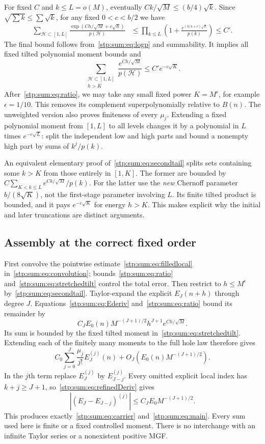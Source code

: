 \documentclass[11pt]{article}
\theoremstyle{remark}\newtheorem{remark}[theorem]{Remark}
\newcommand{\cH}{\mathcal H}
\begin{document}
For fixed $C$ and $k\le L=o(M)$, eventually $Ck/\sqrt M\le(b/4)\sqrt k$. Since $\sqrt{\sum k}\le\sum\sqrt k$, for any fixed $0<c<b/2$ we have
\begin{align}
 \sum_{\cH\subset[1,L]}\frac{\exp(Ch/\sqrt M+c\sqrt h)}{p(\cH)}
 &\le\prod_{k\le L}\left(1+\frac{e^{(b/4+c)\sqrt k}}{p(k)}\right)
 \le C'.\label{stp:sum:eq:stretchedtilt}
\end{align}
The final bound follows from~\eqref{stp:sum:eq:logp} and summability. It implies all fixed tilted polynomial moment bounds and
\begin{equation}\label{stp:sum:eq:secondtail}
 \sum_{\substack{\cH\subset[1,L]\\h>K}}
 \frac{e^{Ch/\sqrt M}}{p(\cH)}\le C'e^{-c\sqrt K}.
\end{equation}
After~\eqref{stp:sum:eq:ratio}, we may take any small fixed power $K=M^\epsilon$, for example $\epsilon=1/10$. This removes its complement superpolynomially relative to $B(n)$. The unweighted version also proves finiteness of every $\mu_j$. Extending a fixed polynomial moment from $[1,L]$ to all levels changes it by a polynomial in $L$ times $e^{-c\sqrt L}$: split the independent low and high parts and bound a nonempty high part by sums of $k^j/p(k)$.

An equivalent elementary proof of~\eqref{stp:sum:eq:secondtail} splits sets containing some $k>K$ from those entirely in $[1,K]$. The former are bounded by $C\sum_{K<k\le L}e^{Ck/\sqrt M}/p(k)$. For the latter use the \emph{new} Chernoff parameter $b/(8\sqrt K)$, not the first-stage parameter involving $L$. Its finite tilted product is bounded, and it pays $e^{-c\sqrt K}$ for energy $h>K$. This makes explicit why the initial and later truncations are distinct arguments.

\subsection{Assembly at the correct fixed order}
First convolve the pointwise estimate~\eqref{stp:sum:eq:filledlocal} in~\eqref{stp:sum:eq:convolution}; bounds~\eqref{stp:sum:eq:ratio} and~\eqref{stp:sum:eq:stretchedtilt} control the total error. Then restrict to $h\le M^\epsilon$ by~\eqref{stp:sum:eq:secondtail}. Taylor-expand the explicit $E_J(n+h)$ through degree $J$. Equations~\eqref{stp:sum:eq:Ederiv} and~\eqref{stp:sum:eq:ratio} bound its remainder by
\[
 C_JE_0(n)M^{-(J+1)/2}h^{J+1}e^{Ch/\sqrt M}.
\]
Its sum is bounded by the fixed tilted moment in~\eqref{stp:sum:eq:stretchedtilt}. Extending each of the finitely many moments to the full hole law therefore gives
\[
 C_0\sum_{j=0}^J\frac{\mu_j}{j!}E_J^{(j)}(n)
 +O_J(E_0(n)M^{-(J+1)/2}).
\]
In the $j$th term replace $E_J^{(j)}$ by $E_{J-j}^{(j)}$. Every omitted explicit local index has $k+j\ge J+1$, so~\eqref{stp:sum:eq:refinedDeriv} gives
\begin{equation}\label{stp:sum:eq:bookkeeping}
 |(E_J-E_{J-j})^{(j)}|\le C_JE_0M^{-(J+1)/2}.
\end{equation}
This produces exactly~\eqref{stp:sum:eq:carrier} and~\eqref{stp:sum:eq:main}. Every sum used here is finite or a fixed controlled moment. There is no interchange with an infinite Taylor series or a nonexistent positive MGF.
\end{document}
